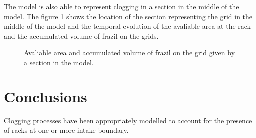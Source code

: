 The model is also able to represent clogging in a section in the middle of the model. The figure \ref{fig:clog_sec} shows the location of the section representing the grid in the middle of the model and the temporal evolution of the avaliable area at the rack and the accumulated volume of frazil on the grids.

\begin{figure}[H]
    \begin{center}
    \end{center}
    \caption{Avaliable area and accumulated volume of frazil on the grid given by a section in the model.}
    \label{fig:clog_sec}
\end{figure}

\section{Conclusions}

Clogging processes have been appropriately modelled to account for the presence of racks at one or more intake boundary.

\renewcommand{\labelitemi}{\textbullet}
